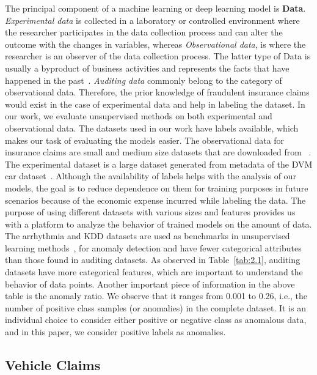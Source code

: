 \documentclass{article}
\begin{document}
The principal component of a machine learning or deep learning model is \textbf{Data}. \textit{Experimental data}  is collected in a laboratory or controlled environment where the researcher participates in the data collection process and can alter the outcome with the changes in variables, whereas \textit{Observational data}, is where the researcher is an observer of the data collection process. The latter type of Data is usually a byproduct of business activities and represents the facts that have happened in the past~\citep{mixtape}. \textit{Auditing data} commonly belong to the category of observational data. Therefore, the prior knowledge of fraudulent insurance claims would exist in the case of experimental data and help in labeling the dataset. In our work, we evaluate unsupervised methods on both experimental and observational data. The datasets used in our work have labels available, which makes our task of evaluating the models easier. The observational data for insurance claims are small and medium size datasets that are downloaded from ~\citep{car_insurance, vehicle_insurance}. The experimental dataset is a large dataset generated from metadata of the DVM car dataset~\citep{DVI}. Although the availability of labels helps with the analysis of our models, the goal is to reduce dependence on them for training purposes in future scenarios because of the economic expense incurred while labeling the data. The purpose of using different datasets with various sizes and features provides us with a platform to analyze the behavior of trained models on the amount of data. The arrhythmia and KDD datasets are used as benchmarks in unsupervised learning methods~\citep{dagmm},\citep{qiu2022latent}  for anomaly detection and have fewer categorical attributes than those found in auditing datasets. As observed in Table~\ref{tab:2.1}, auditing datasets have more categorical features, which are important to understand the behavior of data points. Another important piece of information in the above table is the anomaly ratio. We observe that it ranges from 0.001 to 0.26, i.e., the number of positive class samples (or anomalies) in the complete dataset. It is an individual choice to consider either positive or negative class as anomalous data, and in this paper, we consider positive labels as anomalies.

\subsection{Vehicle Claims}
\end{document}
